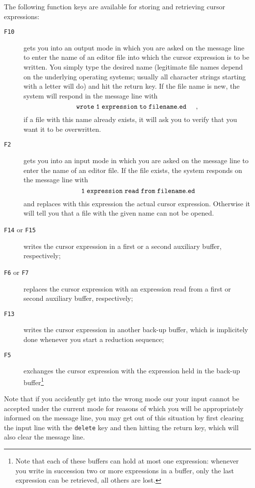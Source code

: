 The following function keys are available for {\mys storing} and {\mys retrieving}
cursor expressions:
\begin{description}
\item[{\tt F10}] gets you into an {\mys output mode}
in which you are asked on the message line to enter the name of an
{\mys editor file}  into which the cursor expression is to be written.
You simply type the desired name (legitimate file names depend on the
 underlying operating systems; usually all character strings starting with a
 letter will do) and hit the return key. If the file name is new, the
system will respond in the message line with
$$
 {\tt wrote\; 1\; expression\; to\; filename.ed}\;\;\;\;\;,
$$
 if a file with this name already exists, it will ask you
to verify that you want it to be overwritten. 
\item[{\tt F2}] gets you into an {\mys input mode} in which you are asked on the message
line to enter the name of an editor file. If the file exists, the system
 responds on the message line with
$$
 {\tt\; 1\; expression\; read\; from \;filename.ed}
$$
and replaces with this expression the actual cursor expression. Otherwise it
will tell you that a file with the given name can not be opened.
\item[{\tt F14} {\rm or} {\tt F15}] writes the cursor expression in a first or a second
{\mys auxiliary buffer}, respectively;
\item[{\tt F6} {\rm or} {\tt F7}] replaces the cursor expression with an expression
 read from a first or second auxiliary buffer, respectively;
\item[{\tt F13}] writes the cursor expression in another {\mys back-up buffer},
which is implicitely done whenever you start a reduction sequence;
\item[{\tt F5}] exchanges the cursor expression with the expression held
in the back-up buffer\footnote{Note that each of these buffers can hold at
most one expression: whenever you write in succession two or more
 expressions in a buffer, only the last expression can be retrieved, all others are lost.}
\end{description}

Note that if you accidently get into the wrong mode our your input cannot
be accepted under the current mode for reasons of which  
you will be appropriately informed on the message line, you may get out
of this situation
 by first clearing the input line with the {\tt delete} key and then hitting
the return key, which will also clear the message line.

